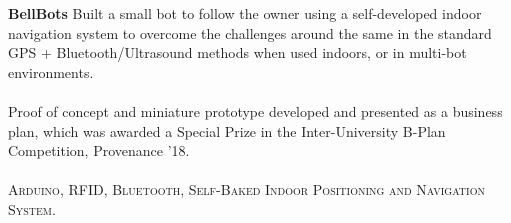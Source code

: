 \documentclass[10pt]{article} %
\begin{document}
\begin{paracol}{2}
{} %
{} %
{\textbf{BellBots}} %
{
Built a small bot to follow the owner using a self-developed indoor navigation system to overcome the challenges around the same in the standard GPS + Bluetooth/Ultrasound methods when used indoors, or in multi-bot environments.\\
\\
Proof of concept and miniature prototype developed and presented as a business plan, which was awarded a
Special Prize in the Inter-University B-Plan Competition, Provenance ’18.\\
\\
\textbf{\faCode} \textsc{Arduino, RFID, Bluetooth, Self-Baked Indoor Positioning and Navigation System.}
} %











\end{paracol}
\end{document}
